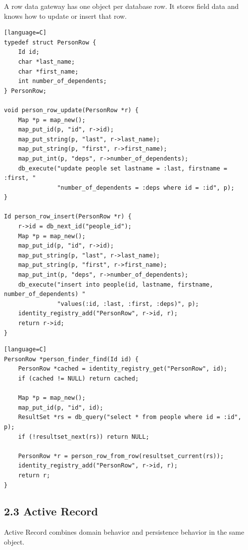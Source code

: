 \documentclass[11pt]{article}
\begin{document}
A row data gateway has one object per database row. It stores field data
and knows how to update or insert that row.

\begin{verbatim}[language=C]
typedef struct PersonRow {
    Id id;
    char *last_name;
    char *first_name;
    int number_of_dependents;
} PersonRow;

void person_row_update(PersonRow *r) {
    Map *p = map_new();
    map_put_id(p, "id", r->id);
    map_put_string(p, "last", r->last_name);
    map_put_string(p, "first", r->first_name);
    map_put_int(p, "deps", r->number_of_dependents);
    db_execute("update people set lastname = :last, firstname = :first, "
               "number_of_dependents = :deps where id = :id", p);
}

Id person_row_insert(PersonRow *r) {
    r->id = db_next_id("people_id");
    Map *p = map_new();
    map_put_id(p, "id", r->id);
    map_put_string(p, "last", r->last_name);
    map_put_string(p, "first", r->first_name);
    map_put_int(p, "deps", r->number_of_dependents);
    db_execute("insert into people(id, lastname, firstname, number_of_dependents) "
               "values(:id, :last, :first, :deps)", p);
    identity_registry_add("PersonRow", r->id, r);
    return r->id;
}
\end{verbatim}

\begin{verbatim}[language=C]
PersonRow *person_finder_find(Id id) {
    PersonRow *cached = identity_registry_get("PersonRow", id);
    if (cached != NULL) return cached;

    Map *p = map_new();
    map_put_id(p, "id", id);
    ResultSet *rs = db_query("select * from people where id = :id", p);
    if (!resultset_next(rs)) return NULL;

    PersonRow *r = person_row_from_row(resultset_current(rs));
    identity_registry_add("PersonRow", r->id, r);
    return r;
}
\end{verbatim}

\subsection{2.3 Active Record}\label{active-record}

Active Record combines domain behavior and persistence behavior in the
same object.
\end{document}
